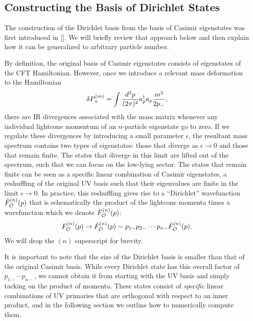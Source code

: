 \begin{subappendices}

\section{Constructing the Basis of Dirichlet States}
\label{sec:ConstructingBasis}


The construction of the Dirichlet basis from the basis of Casimir eigenstates was first introduced in []. We will briefly review that approach below and then explain how it can be generalized to arbitrary particle number.

By definition, the original basis of Casimir eigenstates consists of eigenstates of the CFT Hamiltonian. However, once we introduce a relevant mass deformation to the Hamiltonian \begin{equation}
	\delta P_+^{(m)} = \int \frac{d^2 p}{(2\pi)^2} a^\dagger_p a_p \frac{m^2}{2 p_-},
\end{equation} there are IR divergences associated with the mass matrix whenever any individual lightcone momentum of an $n$-particle eigenstate go to zero. If we regulate these divergences by introducing a small parameter $\epsilon$, the resultant mass spectrum contains two types of eigenstates: those that diverge as $\epsilon \to 0$ and those that remain finite. The states that diverge in this limit are lifted out of the spectrum, such that we can focus on the low-lying sector. The states that remain finite can be seen as a specific linear combination of Casimir eigenstates, a reshuffling of the original UV basis such that their eigenvalues are finite in the limit $\epsilon \to 0$. In practice, this reshuffling gives rise to a ``Dirichlet'' wavefunction $\tilde{F}_{{\cal O}}^{(n)}(p)$ that is schematically the product of the lightcone momenta times a wavefunction which we denote $\bar{F}_{{\cal O}}^{(n)}(p)$: \begin{equation}
	F_{{\cal O}}^{(n)}(p) \to \tilde{F}_{{\cal O}}^{(n)}(p) \sim p_{1-} p_{2-} \dotsb p_{n-} \bar{F}_{{\cal O}}^{(n)}(p). \label{dirshuffle}
\end{equation} We will drop the $(n)$ superscript for brevity. 

It is important to note that the size of the Dirichlet basis is smaller than that of the original Casimir basis. While every Dirichlet state has this overall factor of $p_{1-} \dotsb p_{n-}$, we cannot obtain it from starting with the UV basis and simply tacking on the product of momenta. These states consist of \textit{specific} linear combinations of UV primaries that are orthogonal with respect to an inner product, and in the following section we outline how to numerically compute them.


\end{subappendices}
